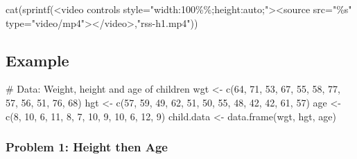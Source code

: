 \documentclass[
  letterpaper,
]{scrbook}
\newenvironment{Shaded}{\begin{snugshade}}{\end{snugshade}}
\newcommand{\CommentTok}[1]{\textcolor[rgb]{0.37,0.37,0.37}{#1}}
\newcommand{\DecValTok}[1]{\textcolor[rgb]{0.68,0.00,0.00}{#1}}
\newcommand{\FunctionTok}[1]{\textcolor[rgb]{0.28,0.35,0.67}{#1}}
\newcommand{\NormalTok}[1]{\textcolor[rgb]{0.00,0.23,0.31}{#1}}
\newcommand{\OtherTok}[1]{\textcolor[rgb]{0.00,0.23,0.31}{#1}}
\newcommand{\StringTok}[1]{\textcolor[rgb]{0.13,0.47,0.30}{#1}}
\begin{document}
\begin{Shaded}
\begin{Highlighting}[]
\FunctionTok{cat}\NormalTok{(}\FunctionTok{sprintf}\NormalTok{(}\StringTok{\textquotesingle{}\textless{}video controls style="width:100\%\%;height:auto;"\textgreater{}\textless{}source src="\%s" type="video/mp4"\textgreater{}\textless{}/video\textgreater{}\textquotesingle{}}\NormalTok{,}\StringTok{"rss{-}h1.mp4"}\NormalTok{))}
\end{Highlighting}
\end{Shaded}

\subsection{Example}\label{example}

\begin{Shaded}
\begin{Highlighting}[]
\CommentTok{\# Data: Weight, height and age of children}
\NormalTok{wgt }\OtherTok{\textless{}{-}} \FunctionTok{c}\NormalTok{(}\DecValTok{64}\NormalTok{, }\DecValTok{71}\NormalTok{, }\DecValTok{53}\NormalTok{, }\DecValTok{67}\NormalTok{, }\DecValTok{55}\NormalTok{, }\DecValTok{58}\NormalTok{, }\DecValTok{77}\NormalTok{, }\DecValTok{57}\NormalTok{, }\DecValTok{56}\NormalTok{, }\DecValTok{51}\NormalTok{, }\DecValTok{76}\NormalTok{, }\DecValTok{68}\NormalTok{)}
\NormalTok{hgt }\OtherTok{\textless{}{-}} \FunctionTok{c}\NormalTok{(}\DecValTok{57}\NormalTok{, }\DecValTok{59}\NormalTok{, }\DecValTok{49}\NormalTok{, }\DecValTok{62}\NormalTok{, }\DecValTok{51}\NormalTok{, }\DecValTok{50}\NormalTok{, }\DecValTok{55}\NormalTok{, }\DecValTok{48}\NormalTok{, }\DecValTok{42}\NormalTok{, }\DecValTok{42}\NormalTok{, }\DecValTok{61}\NormalTok{, }\DecValTok{57}\NormalTok{)}
\NormalTok{age }\OtherTok{\textless{}{-}} \FunctionTok{c}\NormalTok{(}\DecValTok{8}\NormalTok{, }\DecValTok{10}\NormalTok{, }\DecValTok{6}\NormalTok{, }\DecValTok{11}\NormalTok{, }\DecValTok{8}\NormalTok{, }\DecValTok{7}\NormalTok{, }\DecValTok{10}\NormalTok{, }\DecValTok{9}\NormalTok{, }\DecValTok{10}\NormalTok{, }\DecValTok{6}\NormalTok{, }\DecValTok{12}\NormalTok{, }\DecValTok{9}\NormalTok{)}
\NormalTok{child.data }\OtherTok{\textless{}{-}} \FunctionTok{data.frame}\NormalTok{(wgt, hgt, age)}
\end{Highlighting}
\end{Shaded}

\subsubsection{Problem 1: Height then
Age}\label{problem-1-height-then-age}
\end{document}
